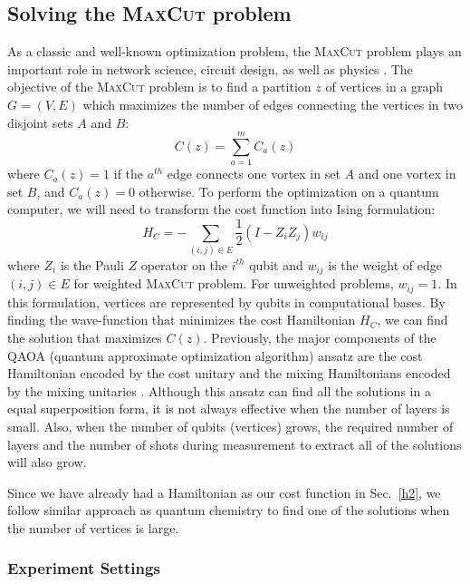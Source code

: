 \documentclass[a4paper,onecolumn,11pt]{quantumarticle}
\begin{document}
\subsection{Solving the \textsc{MaxCut} problem}
As a classic and well-known optimization problem, the \textsc{MaxCut} problem plays an important role in network science, circuit design, as well as physics \cite{Bharti2022-sw}. The objective of the \textsc{MaxCut} problem is to find a partition $z$ of vertices in a graph $G = (V, E)$ which maximizes the number of edges connecting the vertices in two disjoint sets $A$ and $B$:
\begin{equation}
    C(z) =\sum_{a=1}^m C_a(z)
\end{equation}
where $C_a(z) = 1$ if the $a^{th}$ edge connects one vortex in set $A$ and one vortex in set $B$, and $C_a(z) = 0$ otherwise. To perform the optimization on a quantum computer, we will need to transform the cost function into Ising formulation:
\begin{equation}
    H_C = -\sum_{(i, j)\in E} \frac{1}{2} (I - Z_i Z_j)w_{ij}
\end{equation}\label{qaoa_ham}
where $Z_i$ is the Pauli $Z$ operator on the $i^{th}$ qubit and $w_{ij}$ is the weight of edge $(i, j)\in E$ for weighted \textsc{MaxCut} problem. For unweighted problems, $w_{ij} = 1$. In this formulation, vertices are represented by qubits in computational bases. By finding the wave-function that minimizes the cost Hamiltonian $H_C$, we can find the solution that maximizes $C(z)$. Previously, the major components of the QAOA (quantum approximate optimization algorithm) ansatz are the cost Hamiltonian encoded by the cost unitary and the mixing Hamiltonians encoded by the mixing unitaries \cite{Farhi2014-ug}. Although this ansatz can find all the solutions in a equal superposition form, it is not always effective when the number of layers is small. Also, when the number of qubits (vertices) grows, the required number of layers and the number of shots during measurement to extract all of the solutions will also grow.

Since we have already had a Hamiltonian as our cost function in Sec.~\ref{h2}, we follow similar approach as quantum chemistry to find one of the solutions when the number of vertices is large.

\subsubsection{Experiment Settings}
\end{document}
